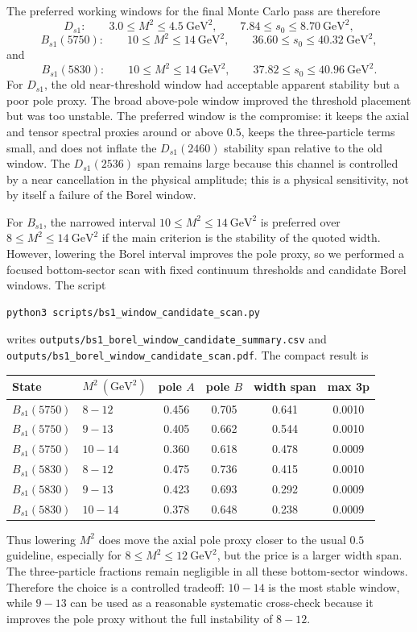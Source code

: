 \documentclass[11pt]{article}
\newcommand{\GeV}{\mathrm{GeV}}
\begin{document}
The preferred working windows for the final Monte Carlo pass are therefore
\[
  D_{s1}:\qquad 3.0\le M^2\le 4.5~\GeV^2,\qquad
  7.84\le s_0\le 8.70~\GeV^2 ,
\]
\[
  B_{s1}(5750):\qquad
  10\le M^2\le 14~\GeV^2,\qquad
  36.60\le s_0\le 40.32~\GeV^2 ,
\]
and
\[
  B_{s1}(5830):\qquad
  10\le M^2\le 14~\GeV^2,\qquad
  37.82\le s_0\le 40.96~\GeV^2 .
\]
For \(D_{s1}\), the old near-threshold window had acceptable apparent
stability but a poor pole proxy.  The broad above-pole window improved the
threshold placement but was too unstable.  The preferred window is the
compromise: it keeps the axial and tensor spectral proxies around or above
\(0.5\), keeps the three-particle terms small, and does not inflate the
\(D_{s1}(2460)\) stability span relative to the old window.  The
\(D_{s1}(2536)\) span remains large because this channel is controlled by a
near cancellation in the physical amplitude; this is a physical sensitivity,
not by itself a failure of the Borel window.

For \(B_{s1}\), the narrowed interval \(10\le M^2\le14~\GeV^2\) is preferred
over \(8\le M^2\le14~\GeV^2\) if the main criterion is the stability of the
quoted width.  However, lowering the Borel interval improves the pole proxy, so
we performed a focused bottom-sector scan with fixed continuum thresholds and
candidate Borel windows.  The script
\begin{verbatim}
python3 scripts/bs1_window_candidate_scan.py
\end{verbatim}
writes
\texttt{outputs/bs1\_borel\_window\_candidate\_summary.csv} and
\texttt{outputs/bs1\_borel\_window\_candidate\_scan.pdf}.  The compact result is
\begin{center}
\begin{tabular}{llcccc}
\toprule
State & \(M^2~(\GeV^2)\) & pole \(A\) & pole \(B\) & width span & max 3p\\
\midrule
\(B_{s1}(5750)\) & \(8-12\) & 0.456 & 0.705 & 0.641 & 0.0010\\
\(B_{s1}(5750)\) & \(9-13\) & 0.405 & 0.662 & 0.544 & 0.0010\\
\(B_{s1}(5750)\) & \(10-14\) & 0.360 & 0.618 & 0.478 & 0.0009\\
\(B_{s1}(5830)\) & \(8-12\) & 0.475 & 0.736 & 0.415 & 0.0010\\
\(B_{s1}(5830)\) & \(9-13\) & 0.423 & 0.693 & 0.292 & 0.0009\\
\(B_{s1}(5830)\) & \(10-14\) & 0.378 & 0.648 & 0.238 & 0.0009\\
\bottomrule
\end{tabular}
\end{center}
Thus lowering \(M^2\) does move the axial pole proxy closer to the usual
\(0.5\) guideline, especially for \(8\le M^2\le12~\GeV^2\), but the price is a
larger width span.  The three-particle fractions remain negligible in all these
bottom-sector windows.  Therefore the choice is a controlled tradeoff: \(10-14\)
is the most stable window, while \(9-13\) can be used as a reasonable systematic
cross-check because it improves the pole proxy without the full instability of
\(8-12\).
\end{document}
